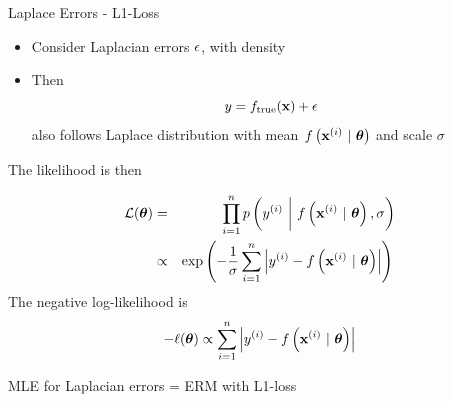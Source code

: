 \documentclass[11pt,compress,t,notes=noshow, xcolor=table]{beamer}
\begin{document}
\begin{vbframe}{Laplace Errors - L1-Loss}

\begin{itemize}
    \item Consider Laplacian errors $\epsilon$, with density 
\end{itemize}
\lz

\begin{itemize}
\item Then
$$
y = f_{\text{true}}(\mathbf{x}) + \epsilon 
$$
also follows Laplace distribution with mean $f\left(\mathbf{x}^{(i)} ~|~ \bm{\theta}\right)$ and scale  $\sigma$ 
\end{itemize}
\framebreak 

The likelihood is then 

\begin{eqnarray*}
\mathcal{L}(\bm{\theta}) &=& \prod_{i=1}^n p\left(y^{(i)} ~\bigg|~ f\left(\mathbf{x}^{(i)} ~|~ \bm{\theta}\right), \sigma\right) \\ &\propto& \exp\left(-\frac{1}{\sigma}\sum\limits_{i=1}^n \left|y^{(i)} - f\left(\mathbf{x}^{(i)} ~|~ \bm{\theta}\right)\right|\right)\,
\end{eqnarray*}
The negative log-likelihood is
$$
- \ell(\bm{\theta}) \propto \sum\limits_{i=1}^n \left|y^{(i)} - f\left(\mathbf{x}^{(i)} ~|~ \bm{\theta}\right)\right|
$$

MLE for Laplacian errors = ERM with L1-loss 


\end{vbframe}
\end{document}
